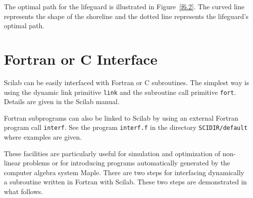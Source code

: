	The optimal path for the lifeguard is illustrated in
Figure~\ref{f6.2}.  The curved line represents the shape of the
shoreline and the dotted line represents the lifeguard's optimal
path.
%

%


\section{Fortran or C Interface}

 Scilab can be easily interfaced with Fortran 
or C subroutines. 
The simplest way is using the dynamic link primitive 
{\tt link} and the subroutine
call primitive {\tt fort}. Details are
given in the Scilab manual.

Fortran subprograms can also be linked to Scilab by using an external 
Fortran program call {\tt interf}. See
the program {\tt interf.f} in the directory {\tt SCIDIR/default} where
examples are given.

These facilities are particularly useful
for simulation and optimization of non-linear problems or for
introducing programs automatically generated by the computer algebra
system Maple.  There are
two steps for interfacing dynamically a subroutine written 
in Fortran with Scilab. 
These two steps are demonstrated in what follows.

